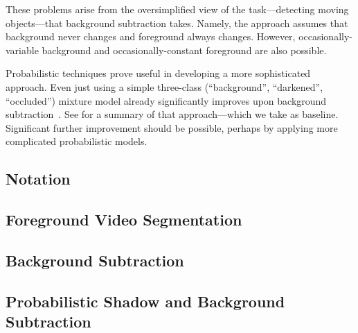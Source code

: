 These problems arise from the oversimplified view of the
task---detecting moving objects---that
background subtraction takes.  Namely, the approach assumes that
background never changes and foreground always changes.  However,
occasionally-variable background and occasionally-constant 
foreground are also possible.


Probabilistic techniques prove useful in developing a more
sophisticated approach.
Even just using a simple three-class (``background'', ``darkened'',
``occluded'') mixture model already significantly improves upon
background subtraction~\cite{friedman97uai}.  See
 for a summary of
that approach---which we take as baseline. 
Significant further improvement should be possible, perhaps
by applying more complicated probabilistic models.







\subsection{Notation}
\label{sec:notation}


\subsection{Foreground Video Segmentation}
\label{sec:formal-problem}

\subsection{Background Subtraction}
\label{background-subtraction-section}



\subsection{Probabilistic Shadow and Background Subtraction}
\label{shadow-and-background-subtraction-section}


